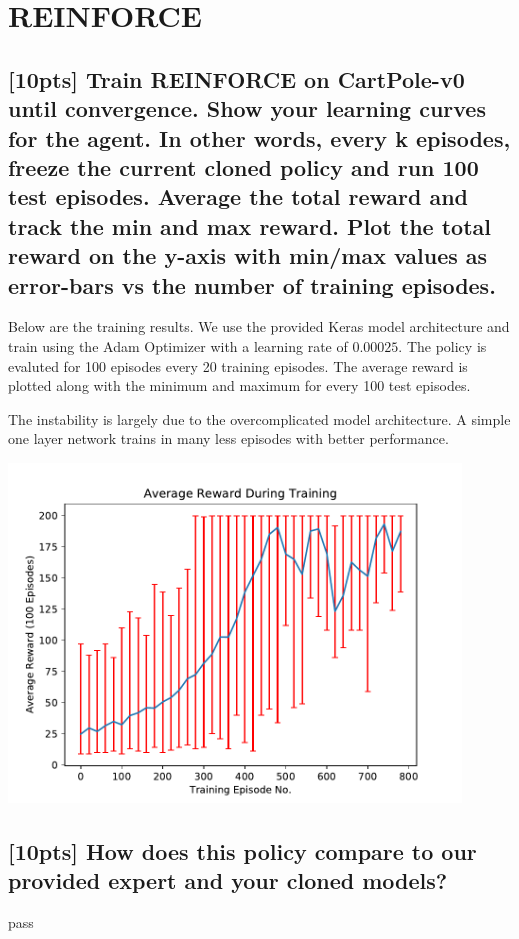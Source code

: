 \documentclass{article}
\begin{document}
\section{REINFORCE}

\subsection{[10pts] Train REINFORCE on CartPole-v0 until convergence. Show your learning curves for the agent. In other words, every k episodes, freeze the current cloned policy and run 100 test episodes. Average the total reward and track the min and max reward. Plot the total reward on the y-axis with min/max values as error-bars vs the number of training episodes.}

Below are the training results. We use the provided Keras model architecture and train using the Adam Optimizer with a learning rate of $0.00025$. The policy is evaluted for 100 episodes every 20 training episodes. The average reward is plotted along with the minimum and maximum for every 100 test episodes.

The instability is largely due to the overcomplicated model architecture. A simple one layer network trains in many less episodes with better performance.
\begin{center}
  \includegraphics[width=12cm]{images/reinforce_plot.pdf}
\end{center}

\subsection{[10pts] How does this policy compare to our provided expert and your cloned models?}

pass



\small
\medskip


\end{document}
